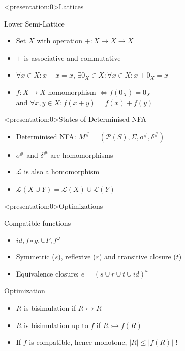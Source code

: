 \begin{frame}<presentation:0>{Lattices}
  \begin{block}{Lower Semi-Lattice}
    \begin{itemize}
      \item Set $X$ with operation $+: X \to X \to X$
      \item $+$ is associative and commutative
      \item $\forall x \in X: x + x = x$, $\exists 0_X \in X: \forall x \in X: x + 0_X = x$
      \item $f: X \to X$ homomorphism $\Leftrightarrow f(0_X) = 0_X $\\
            and $\forall x, y \in X: f(x+y) = f(x) + f(y)$
    \end{itemize}
  \end{block}
\end{frame}

\begin{frame}<presentation:0>{States of Determinised NFA}
  \begin{itemize}
    \item Determinised NFA: $M^\# = (\mathcal{P}(S), \Sigma, o^\#, \delta^\#)$
    \item $o^\#$ and $\delta^\#$ are homomorphisms
    \item $\mathcal{L}$ is also a homomorphism
    \item $\mathcal{L}(X \cup Y) = \mathcal{L}({X}) \cup \mathcal{L}({Y})$
  \end{itemize}
\end{frame}

\begin{frame}<presentation:0>{Optimizations}
  \begin{block}{Compatible functions}
    \begin{itemize}
      \item $id, f \circ g, \cup F, f^\omega$
      \item Symmetric ($s$), reflexive ($r$) and transitive closure ($t$)
      \item Equivalence closure: $e = (s \cup r \cup t \cup id)^\omega$
    \end{itemize}
  \end{block}

  \begin{block}{Optimization}
    \begin{itemize}
      \item $R$ is bisimulation if $R \rightarrowtail R$
      \item $R$ is bisimulation up to $f$ if $R \rightarrowtail f(R)$
      \item If $f$ is compatible, hence monotone, $|R| \leq |f(R)|$ !
    \end{itemize}
  \end{block}
\end{frame}

